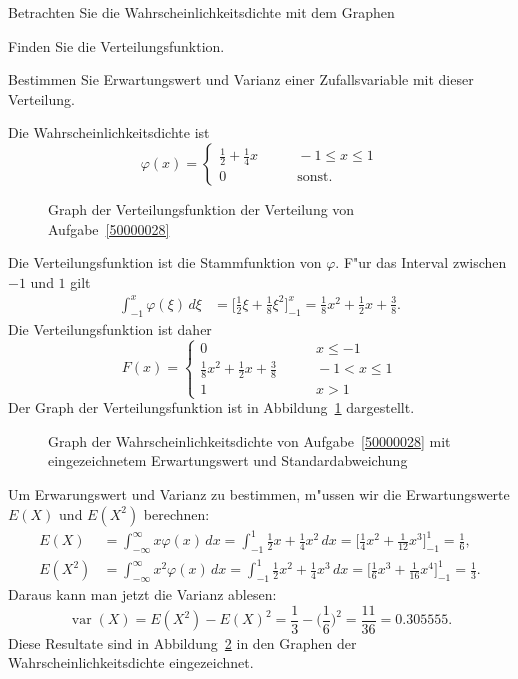 Betrachten Sie die Wahrscheinlichkeitsdichte mit dem Graphen
\begin{center}
\end{center}
\begin{teilaufgaben}
\item Finden Sie die Verteilungsfunktion.
\item Bestimmen Sie Erwartungswert und Varianz einer Zufallsvariable
mit dieser Verteilung.
\end{teilaufgaben}

\begin{loesung}
Die Wahrscheinlichkeitsdichte ist 
\[
\varphi(x)=\begin{cases}
\frac12+\frac14x&\qquad -1\le x\le 1\\
0&\qquad\text{sonst.}
\end{cases}
\]
\begin{teilaufgaben}
\item
\begin{figure}
\centering
{}
\caption{Graph der Verteilungsfunktion der Verteilung von
Aufgabe~\ref{50000028}
\label{50000028:verteilungsfunktion}}
\end{figure}
Die Verteilungsfunktion ist die Stammfunktion von $\varphi$.
F"ur das Interval zwischen $-1$ und $1$ gilt
\begin{align*}
\int_{-1}^x\varphi(\xi)\,d\xi
&=
\biggl[\frac12 \xi+\frac18\xi^2\biggr]_{-1}^x
=
\frac18x^2+\frac12x+\frac{3}{8}.
\end{align*}
Die Verteilungsfunktion ist daher
\[
F(x)=\begin{cases}
0&\qquad x \le -1\\
\frac18x^2+\frac12x+\frac{3}{8}
&\qquad -1 < x\le 1\\
1&\qquad x >1
\end{cases}
\]
Der Graph der Verteilungsfunktion ist in
Abbildung~\ref{50000028:verteilungsfunktion} dargestellt.
\item
\begin{figure}
\centering
{}
\caption{Graph der Wahrscheinlichkeitsdichte von Aufgabe~\ref{50000028}
mit eingezeichnetem Erwartungswert und Standardabweichung
\label{50000028:varianz}}
\end{figure}
Um Erwarungswert und Varianz zu bestimmen, m"ussen wir die Erwartungswerte
$E(X)$ und $E(X^2)$ berechnen:
\begin{align*}
E(X)&=
\int_{-\infty}^\infty x\varphi(x)\,dx
=
\int_{-1}^{1}
\frac12x+\frac14x^2
\,dx
=
\biggl[
\frac14x^2+\frac1{12}x^3
\biggr]_{-1}^{1}
=\frac1{6},
\\
E(X^2)
&=
\int_{-\infty}^\infty x^2\varphi(x)\,dx
=
\int_{-1}^{1}
\frac12x^2+\frac14x^3
\,dx
=
\biggl[
\frac16x^3+\frac1{16}x^4
\biggr]_{-1}^{1}
=\frac1{3}.
\end{align*}
Daraus kann man jetzt die Varianz ablesen:
\[
\operatorname{var}(X) = E(X^2)-E(X)^2=\frac1{3}-\biggl(\frac1{6}\biggr)^2
=\frac{11}{36}=0.305555.
\]
Diese Resultate sind in Abbildung~\ref{50000028:varianz} in den Graphen
der Wahrscheinlichkeitsdichte eingezeichnet.
\qedhere
\end{teilaufgaben}
\end{loesung}

